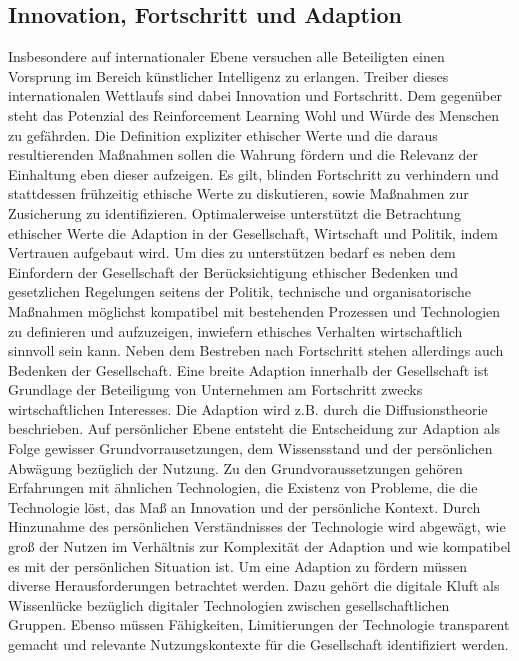 \subsection{Innovation, Fortschritt und Adaption}
Insbesondere auf internationaler Ebene versuchen alle Beteiligten einen Vorsprung im Bereich künstlicher Intelligenz zu erlangen.
Treiber dieses internationalen Wettlaufs sind dabei Innovation und Fortschritt.
Dem gegenüber steht das Potenzial des Reinforcement Learning Wohl und Würde des Menschen zu gefährden.
Die Definition expliziter ethischer Werte und die daraus resultierenden Maßnahmen sollen die Wahrung fördern und die Relevanz der Einhaltung eben dieser aufzeigen.
Es gilt, blinden Fortschritt zu verhindern und stattdessen frühzeitig ethische Werte zu diskutieren, sowie Maßnahmen zur Zusicherung zu identifizieren.
Optimalerweise unterstützt die Betrachtung ethischer Werte die Adaption in der Gesellschaft, Wirtschaft und Politik, indem Vertrauen aufgebaut wird.
Um dies zu unterstützen bedarf es neben dem Einfordern der Gesellschaft der Berücksichtigung ethischer Bedenken und gesetzlichen Regelungen seitens der Politik, technische und organisatorische Maßnahmen möglichst kompatibel mit bestehenden Prozessen und Technologien zu definieren und aufzuzeigen, inwiefern ethisches Verhalten wirtschaftlich sinnvoll sein kann.
\ab 
Neben dem Bestreben nach Fortschritt stehen allerdings auch Bedenken der Gesellschaft.
Eine breite Adaption innerhalb der Gesellschaft ist Grundlage der Beteiligung von Unternehmen am Fortschritt zwecks wirtschaftlichen Interesses.
Die Adaption wird z.B. durch die Diffusionstheorie \cite[S. 513 ff.]{karnowski2013} beschrieben.
Auf persönlicher Ebene entsteht die Entscheidung zur Adaption als Folge gewisser Grundvorrausetzungen, dem Wissensstand und der persönlichen Abwägung bezüglich der Nutzung.
Zu den Grundvoraussetzungen gehören Erfahrungen mit ähnlichen Technologien, die Existenz von Probleme, die die Technologie löst, das Maß an Innovation und der persönliche Kontext.
Durch Hinzunahme des persönlichen Verständnisses der Technologie wird abgewägt, wie groß der Nutzen im Verhältnis zur Komplexität der Adaption und wie kompatibel es mit der persönlichen Situation ist.
Um eine Adaption zu fördern müssen diverse Herausforderungen betrachtet werden.
Dazu gehört die digitale Kluft \cite{rogers2016} als Wissenlücke bezüglich digitaler Technologien zwischen gesellschaftlichen Gruppen.
Ebenso müssen Fähigkeiten, Limitierungen der Technologie transparent gemacht und relevante Nutzungskontexte für die Gesellschaft identifiziert werden.
